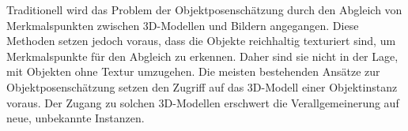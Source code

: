 \documentclass[a4paper, 11pt]{article}
\begin{document}
\begin{multicols*}{2}
    Traditionell wird das Problem der Objektposenschätzung durch den Abgleich von Merkmalspunkten zwischen 3D-Modellen und Bildern angegangen. Diese Methoden setzen jedoch voraus, dass die Objekte reichhaltig texturiert sind, um Merkmalspunkte für den Abgleich zu erkennen. Daher sind sie nicht in der Lage, mit Objekten ohne Textur umzugehen. %
    Die meisten bestehenden Ansätze zur Objektposenschätzung setzen den Zugriff auf das 3D-Modell einer Objektinstanz voraus. Der Zugang zu solchen 3D-Modellen erschwert die Verallgemeinerung auf neue, unbekannte Instanzen. %

\end{multicols*}
\end{document}
